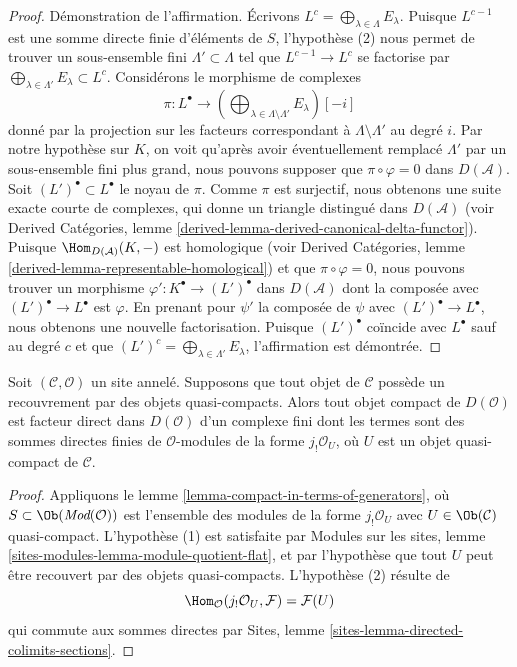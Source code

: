 \begin{proof}
\medskip\noindent
Démonstration de l'affirmation. Écrivons
$L^c = \bigoplus_{\lambda \in \Lambda} E_\lambda$. Puisque $L^{c - 1}$ est
une somme directe finie d'éléments de $S$, l'hypothèse (2) nous permet de
trouver un sous-ensemble fini $\Lambda' \subset \Lambda$ tel que
$L^{c - 1} \to L^c$ se factorise par
$\bigoplus_{\lambda \in \Lambda'} E_\lambda \subset L^c$. Considérons le
morphisme de complexes
$$
\pi :
L^\bullet
\longrightarrow
(\bigoplus\nolimits_{\lambda \in \Lambda \setminus \Lambda'} E_\lambda)[-i]
$$
donné par la projection sur les facteurs correspondant à
$\Lambda \setminus \Lambda'$ au degré $i$. Par notre hypothèse sur $K$, on
voit qu'après avoir éventuellement remplacé $\Lambda'$ par un sous-ensemble
fini plus grand, nous pouvons supposer que $\pi \circ \varphi = 0$ dans
$D(\mathcal{A})$. Soit $(L')^\bullet \subset L^\bullet$ le noyau de $\pi$.
Comme $\pi$ est surjectif, nous obtenons une suite exacte courte de complexes,
qui donne un triangle distingué dans $D(\mathcal{A})$ (voir Derived
Catégories, lemme \ref{derived-lemma-derived-canonical-delta-functor}).
Puisque $\Hom_{D(\mathcal{A})}(K, -)$ est homologique (voir Derived
Catégories, lemme \ref{derived-lemma-representable-homological}) et que
$\pi \circ \varphi = 0$, nous pouvons trouver un morphisme
$\varphi' : K^\bullet \to (L')^\bullet$ dans $D(\mathcal{A})$ dont la
composée avec $(L')^\bullet \to L^\bullet$ est $\varphi$. En prenant pour
$\psi'$ la composée de $\psi$ avec $(L')^\bullet \to L^\bullet$, nous
obtenons une nouvelle factorisation. Puisque $(L')^\bullet$ coïncide avec
$L^\bullet$ sauf au degré $c$ et que
$(L')^c = \bigoplus_{\lambda \in \Lambda'} E_\lambda$, l'affirmation est
démontrée.
\end{proof}

\begin{lemma}
\label{lemma-compact-objects-if-enough-qc}
Soit $(\mathcal{C}, \mathcal{O})$ un site annelé. Supposons que tout objet de
$\mathcal{C}$ possède un recouvrement par des objets quasi-compacts. Alors
tout objet compact de $D(\mathcal{O})$ est facteur direct dans
$D(\mathcal{O})$ d'un complexe fini dont les termes sont des sommes directes
finies de $\mathcal{O}$-modules de la forme $j_!\mathcal{O}_U$, où $U$ est un
objet quasi-compact de $\mathcal{C}$.
\end{lemma}

\begin{proof}
Appliquons le lemme \ref{lemma-compact-in-terms-of-generators}, où
$S \subset \Ob(\textit{Mod}(\mathcal{O}))$ est l'ensemble des modules de la
forme $j_!\mathcal{O}_U$ avec $U \in \Ob(\mathcal{C})$ quasi-compact.
L'hypothèse (1) est satisfaite par Modules sur les sites, lemme
\ref{sites-modules-lemma-module-quotient-flat}, et par l'hypothèse que tout
$U$ peut être recouvert par des objets quasi-compacts. L'hypothèse (2) résulte
de
$$
\Hom_\mathcal{O}(j_!\mathcal{O}_U, \mathcal{F}) = \mathcal{F}(U)
$$
qui commute aux sommes directes par Sites, lemme
\ref{sites-lemma-directed-colimits-sections}.
\end{proof}

